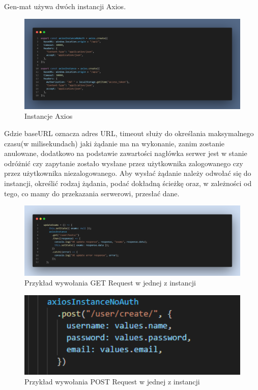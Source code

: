 \documentclass[oneside,polski,logo,indent]{amuthesis}
\begin{document}
\begin{enumerate}
\begin{enumerate}
Gen-mat używa dwóch instancji Axios.
\begin{figure}[H]
\centering
\includegraphics[width=13cm]{axios instancje.png}
\caption{Instancje Axios
}

\end{figure}

Gdzie baseURL oznacza adres URL, timeout służy do określania maksymalnego czasu(w milisekundach) jaki żądanie ma na wykonanie, zanim zostanie anulowane, dodatkowo na podstawie zawartości nagłówka serwer jest w stanie odróżnić czy zapytanie zostało wysłane przez użytkownika zalogowanego czy przez użytkownika niezalogowanego. Aby wysłać żądanie należy  odwołać się do instancji, określić rodzaj żądania, podać dokładną ścieżkę oraz, w zależności od tego, co mamy do przekazania serwerowi, przesłać dane.

\begin{figure}[H]
\centering
\includegraphics[width=13cm]{instance get.png}
\caption{Przykład wywołania GET Request w jednej z instancji
}

\end{figure}

\begin{figure}[H]
\centering
\includegraphics[width=13cm]{axios post.png}
\caption{Przykład wywołania POST Request w jednej z instancji
}


\end{figure}
\end{enumerate}
\end{enumerate}
\end{document}
